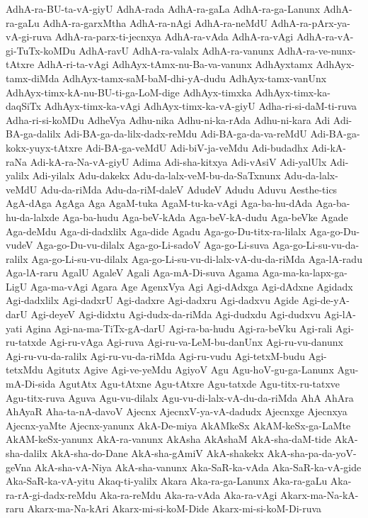 {AdhA-ra-BU-ta-vA-giyU
AdhA-rada
AdhA-ra-gaLa
AdhA-ra-ga-Lanunx
AdhA-ra-gaLu
AdhA-ra-garxMtha
AdhA-ra-nAgi
AdhA-ra-neMdU
AdhA-ra-pArx-ya-vA-gi-ruva
AdhA-ra-parx-ti-jecnxya
AdhA-ra-vAda
AdhA-ra-vAgi
AdhA-ra-vA-gi-TuTx-koMDu
AdhA-ravU
AdhA-ra-valalx
AdhA-ra-vanunx
AdhA-ra-ve-nunx-tAtxre
AdhA-ri-ta-vAgi
AdhAyx-tAmx-nu-Ba-va-vanunx
AdhAyxtamx
AdhAyx-tamx-diMda
AdhAyx-tamx-saM-baM-dhi-yA-dudu
AdhAyx-tamx-vanUnx
AdhAyx-timx-kA-nu-BU-ti-ga-LoM-dige
AdhAyx-timxka
AdhAyx-timx-ka-daqSiTx
AdhAyx-timx-ka-vAgi
AdhAyx-timx-ka-vA-giyU
Adha-ri-si-daM-ti-ruva
Adha-ri-si-koMDu
AdheVya
Adhu-nika
Adhu-ni-ka-rAda
Adhu-ni-kara
Adi
Adi-BA-ga-dalilx
Adi-BA-ga-da-lilx-dadx-reMdu
Adi-BA-ga-da-va-reMdU
Adi-BA-ga-kokx-yuyx-tAtxre
Adi-BA-ga-veMdU
Adi-biV-ja-veMdu
Adi-budadhx
Adi-kA-raNa
Adi-kA-ra-Na-vA-giyU
Adima
Adi-sha-kitxya
Adi-vAsiV
Adi-yalUlx
Adi-yalilx
Adi-yilalx
Adu-dakekx
Adu-da-lalx-veM-bu-da-SaTxnunx
Adu-da-lalx-veMdU
Adu-da-riMda
Adu-da-riM-daleV
AdudeV
Adudu
Aduvu
Aesthe-tics
AgA-dAga
AgAga
Aga
AgaM-tuka
AgaM-tu-ka-vAgi
Aga-ba-hu-dAda
Aga-ba-hu-da-lalxde
Aga-ba-hudu
Aga-beV-kAda
Aga-beV-kA-dudu
Aga-beVke
Agade
Aga-deMdu
Aga-di-dadxlilx
Aga-dide
Agadu
Aga-go-Du-titx-ra-lilalx
Aga-go-Du-vudeV
Aga-go-Du-vu-dilalx
Aga-go-Li-sadoV
Aga-go-Li-suva
Aga-go-Li-su-vu-da-ralilx
Aga-go-Li-su-vu-dilalx
Aga-go-Li-su-vu-di-lalx-vA-du-da-riMda
Aga-lA-radu
Aga-lA-raru
AgalU
AgaleV
Agali
Aga-mA-Di-suva
Agama
Aga-ma-ka-lapx-ga-LigU
Aga-ma-vAgi
Agara
Age
AgenxVya
Agi
Agi-dAdxga
Agi-dAdxne
Agidadx
Agi-dadxlilx
Agi-dadxrU
Agi-dadxre
Agi-dadxru
Agi-dadxvu
Agide
Agi-de-yA-darU
Agi-deyeV
Agi-didxtu
Agi-dudx-da-riMda
Agi-dudxdu
Agi-dudxvu
Agi-lA-yati
Agina
Agi-na-ma-TiTx-gA-darU
Agi-ra-ba-hudu
Agi-ra-beVku
Agi-rali
Agi-ru-tatxde
Agi-ru-vAga
Agi-ruva
Agi-ru-va-LeM-bu-danUnx
Agi-ru-vu-danunx
Agi-ru-vu-da-ralilx
Agi-ru-vu-da-riMda
Agi-ru-vudu
Agi-tetxM-budu
Agi-tetxMdu
Agitutx
Agive
Agi-ve-yeMdu
AgiyoV
Agu
Agu-hoV-gu-ga-Lanunx
Agu-mA-Di-sida
AgutAtx
Agu-tAtxne
Agu-tAtxre
Agu-tatxde
Agu-titx-ru-tatxve
Agu-titx-ruva
Aguva
Agu-vu-dilalx
Agu-vu-di-lalx-vA-du-da-riMda
AhA
AhAra
AhAyaR
Aha-ta-nA-davoV
Ajecnx
AjecnxV-ya-vA-dadudx
Ajecnxge
Ajecnxya
Ajecnx-yaMte
Ajecnx-yanunx
AkA-De-miya
AkAMkeSx
AkAM-keSx-ga-LaMte
AkAM-keSx-yanunx
AkA-ra-vanunx
AkAsha
AkAshaM
AkA-sha-daM-tide
AkA-sha-dalilx
AkA-sha-do-Dane
AkA-sha-gAmiV
AkA-shakekx
AkA-sha-pa-da-yoV-geVna
AkA-sha-vA-Niya
AkA-sha-vanunx
Aka-SaR-ka-vAda
Aka-SaR-ka-vA-gide
Aka-SaR-ka-vA-yitu
Akaq-ti-yalilx
Akara
Aka-ra-ga-Lanunx
Aka-ra-gaLu
Aka-ra-rA-gi-dadx-reMdu
Aka-ra-reMdu
Aka-ra-vAda
Aka-ra-vAgi
Akarx-ma-Na-kA-raru
Akarx-ma-Na-kAri
Akarx-mi-si-koM-Dide
Akarx-mi-si-koM-Di-ruva
}
